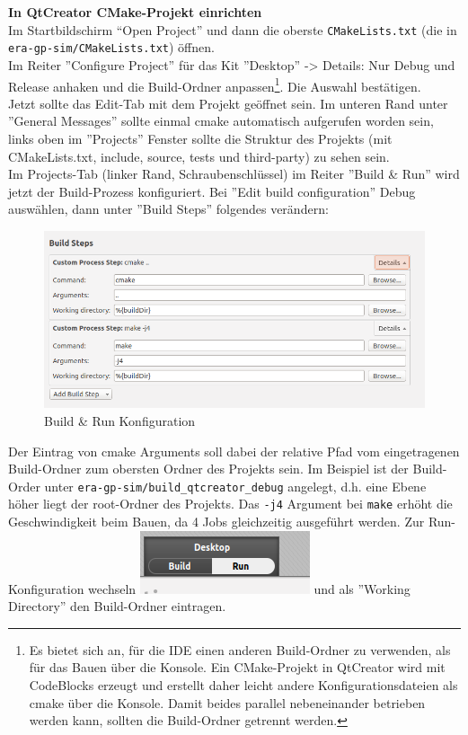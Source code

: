 \textbf{In QtCreator CMake-Projekt einrichten}\\
Im Startbildschirm ``Open Project'' und dann die oberste \texttt{CMakeLists.txt}
(die in \texttt{era-gp-sim/CMakeLists.txt}) öffnen.\\ Im Reiter ''Configure
Project'' für das Kit ''Desktop'' -> Details: Nur Debug und Release anhaken und
die Build-Ordner anpassen\footnote{Es bietet sich an, für die IDE einen anderen
Build-Ordner zu verwenden, als für das Bauen über die Konsole. Ein CMake-Projekt
in QtCreator wird mit CodeBlocks erzeugt und erstellt daher leicht andere
Konfigurationsdateien als cmake über die Konsole. Damit beides parallel
nebeneinander betrieben werden kann, sollten die Build-Ordner getrennt werden.}.
Die Auswahl bestätigen.\\ Jetzt sollte das Edit-Tab mit dem Projekt geöffnet
sein. Im unteren Rand unter ''General Messages'' sollte einmal cmake automatisch
aufgerufen worden sein, links oben im ''Projects'' Fenster sollte die Struktur
des Projekts (mit CMakeLists.txt, include, source, tests und third-party) zu
sehen sein.\\ Im Projects-Tab (linker Rand, Schraubenschlüssel) im Reiter
''Build \& Run'' wird jetzt der Build-Prozess konfiguriert. Bei ''Edit build
configuration'' Debug auswählen, dann unter ''Build Steps'' folgendes
verändern:\\
\begin{figure}[H]
	\centering
	\includegraphics[scale=0.5]{images/setup-qtcreator-buildrun-config.png}	
	\caption{Build \& Run Konfiguration}
\end{figure}

Der Eintrag von cmake Arguments soll dabei der relative Pfad vom eingetragenen
Build-Ordner zum obersten Ordner des Projekts sein. Im Beispiel ist der
Build-Order unter \texttt{era-gp-sim/build\_qtcreator\_debug} angelegt, d.h.
eine Ebene höher liegt der root-Ordner des Projekts. Das \texttt{-j4} Argument
bei \texttt{make} erhöht die Geschwindigkeit beim Bauen, da 4 Jobs gleichzeitig
ausgeführt werden. Zur Run-Konfiguration wechseln
\includegraphics[scale=1.0]{images/setup-qtcreator-run-config} und als ''Working
Directory'' den Build-Ordner eintragen.\\

